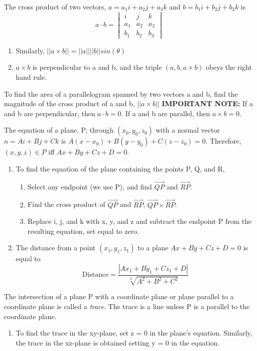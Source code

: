 \documentclass[12pt, letterpaper]{article}
\begin{document}
The cross product of two vectors, \(a = a_1i + a_2j + a_3k\) and \(b = b_1i + b_2j + b_3k\) is 
\[
a \cdot b =
\begin{vmatrix}
i & j & k\\
a_{1} & a_{2} & a_{3}\\
b_{1} & b_{2} & b_{3}
\end{vmatrix}
\]
\begin{enumerate}
    \item Similarly, \(||a \times b|| = ||a||||b||sin(\theta)\)
    \item \(a \times b\) is perpendicular to a and b, and the triple \((a, b, a \times b)\) obeys the right hand rule.
\end{enumerate}
To find the area of a parallelogram spanned by two vectors a and b, find the magnitude of the cross product of a and b, \(||a \times b||\)
\newline
\textbf{IMPORTANT NOTE: }If a and b are perpendicular, then \(a \cdot b = 0\). If a and b are parallel, then \(a \times b = 0\).

The equation of a plane, P, through \((x_0, y_0, z_0)\) with a normal vector \(n = Ai + Bj + Ck\) is \(A(x - x_0) + B(y - y_0) + C(z - z_0) = 0\). Therefore, \((x,y,z) \in P\) iff \(Ax + By + Cz + D = 0\).
\begin{enumerate}
    \item To find the equation of the plane containing the points P, Q, and R, 
    \begin{enumerate}
        \item Select any endpoint (we use P), and find \(\overrightarrow{QP}\) and \(\overrightarrow{RP}\).
        \item Find the cross product of \(\overrightarrow{QP}\) and \(\overrightarrow{RP}\), \(\overrightarrow{QP} \times \overrightarrow{RP}\).
        \item Replace i, j, and k with x, y, and z and subtract the endpoint P from the resulting equation, set equal to zero.
    \end{enumerate}
    \item The distance from a point \((x_1, y_1, z_1)\) to a plane \(Ax + By + Cz + D = 0\) is equal to \[\text{Distance} = \frac{|Ax_1 + By_1 + Cz_1 + D|}{\sqrt[2]{A^2 + B^2 + C^2}} \]
\end{enumerate}
The intersection of a plane P with a coordinate plane or plane parallel to a coordinate plane is called a \textit{trace}. The trace is a line unless P is a parallel to the coordinate plane.
\begin{enumerate}
    \item To find the trace in the xy-plane, set z = 0 in the plane's equation. Similarly, the trace in the xz-plane is obtained setting y = 0 in the equation.
\end{enumerate}
\end{document}
